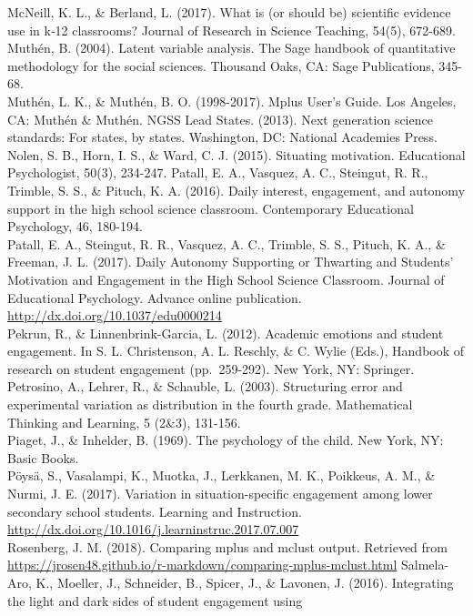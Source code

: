 \documentclass[]{msu-thesis}
\theoremstyle{definition}
\theoremstyle{definition}
\theoremstyle{definition}
\theoremstyle{remark}
\begin{document}
McNeill, K. L., \& Berland, L. (2017). What is (or should be) scientific
evidence use in k‐12 classrooms? Journal of Research in Science
Teaching, 54(5), 672-689.\\
Muthén, B. (2004). Latent variable analysis. The Sage handbook of
quantitative methodology for the social sciences. Thousand Oaks, CA:
Sage Publications, 345-68.\\
Muthén, L. K., \& Muthén, B. O. (1998-2017). Mplus User's Guide. Los
Angeles, CA: Muthén \& Muthén. NGSS Lead States. (2013). Next generation
science standards: For states, by states. Washington, DC: National
Academies Press.\\
Nolen, S. B., Horn, I. S., \& Ward, C. J. (2015). Situating motivation.
Educational Psychologist, 50(3), 234-247. Patall, E. A., Vasquez, A. C.,
Steingut, R. R., Trimble, S. S., \& Pituch, K. A. (2016). Daily
interest, engagement, and autonomy support in the high school science
classroom. Contemporary Educational Psychology, 46, 180-194.\\
Patall, E. A., Steingut, R. R., Vasquez, A. C., Trimble, S. S., Pituch,
K. A., \& Freeman, J. L. (2017). Daily Autonomy Supporting or Thwarting
and Students' Motivation and Engagement in the High School Science
Classroom. Journal of Educational Psychology. Advance online
publication. \url{http://dx.doi.org/10.1037/edu0000214}\\
Pekrun, R., \& Linnenbrink-Garcia, L. (2012). Academic emotions and
student engagement. In S. L. Christenson, A. L. Reschly, \& C. Wylie
(Eds.), Handbook of research on student engagement (pp.~259-292). New
York, NY: Springer. Petrosino, A., Lehrer, R., \& Schauble, L. (2003).
Structuring error and experimental variation as distribution in the
fourth grade. Mathematical Thinking and Learning, 5 (2\&3), 131-156.\\
Piaget, J., \& Inhelder, B. (1969). The psychology of the child. New
York, NY: Basic Books.\\
Pöysä, S., Vasalampi, K., Muotka, J., Lerkkanen, M. K., Poikkeus, A. M.,
\& Nurmi, J. E. (2017). Variation in situation-specific engagement among
lower secondary school students. Learning and Instruction.
\url{http://dx.doi.org/10.1016/j.learninstruc.2017.07.007}\\
Rosenberg, J. M. (2018). Comparing mplus and mclust output. Retrieved
from
\url{https://jrosen48.github.io/r-markdown/comparing-mplus-mclust.html}
Salmela-Aro, K., Moeller, J., Schneider, B., Spicer, J., \& Lavonen, J.
(2016). Integrating the light and dark sides of student engagement using
\end{document}
